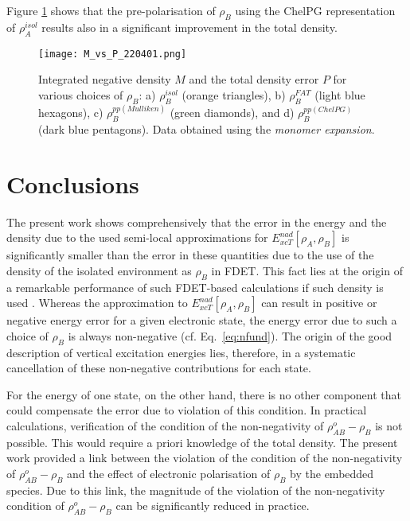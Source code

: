 \documentclass[journal=jctcce,manuscript=article]{achemso}
\newcommand{\nr}[1]{\color{red}#1\color{black}}
\begin{document}
Figure \ref{fig:M_vs_P} shows that the pre-polarisation of $\rho_B$ using the  ChelPG representation of $\rho_A^{isol}$
results also \nr{in } a significant improvement in the total density.

\begin{figure}[H]
\centering
\texttt{[image: M\_vs\_P\_220401.png]}
\caption{Integrated negative density $M$ and the total density error $P$ for various choices of $\rho_B$:  a) $\rho_B^{isol}$ (orange triangles), b) $\rho_B^{FAT}$ (light blue hexagons), c) $\rho_B^{pp(Mulliken)}$ (green diamonds), and d) $\rho_B^{pp(ChelPG)}$ (dark blue pentagons). Data obtained using the {\it monomer expansion}.}
\label{fig:M_vs_P}
\end{figure}


\section{Conclusions}

The present work shows comprehensively that the error in the energy and the density due to the used semi-local approximations for 
${E}_{xcT}^{nad}[\rho_A,\rho_B]$ is significantly  smaller than the error in these quantities due to  the use of the density of the isolated environment as $\rho_B$ in FDET.
This fact lies at the origin of  a  remarkable performance of such FDET\nr{-}based calculations if such density is used  \cite{Ricardi2018}.
Whereas  the approximation  to ${E}_{xcT}^{nad}[\rho_A,\rho_B]$ can result in \nr{positive or negative energy error for } a given electronic state, the \nr{energy error due to  such a choice of $\rho_B$ } is always non-negative (cf. Eq.~\ref{eq:nfund}). The origin of the good description of vertical excitation energies lies, therefore, in a systematic cancellation of these non-negative contributions for each state.

For the energy of one state, on the other hand, there is no other component that could compensate \nr{the } error due to violation of this condition. In practical calculations, verification  of the condition of the non-negativity of $\rho^{o}_{AB}-\rho_B$ is not possible. This would require a priori knowledge of the total density.
The present work provided a link between the violation of the condition of the non-negativity of $\rho^{o}_{AB}-\rho_B$
and the effect of electronic polarisation of $\rho_B$ by the embedded species. Due to this link, the magnitude
of the violation of the non-negativity condition of $\rho^{o}_{AB}-\rho_B$ can be significantly reduced  in practice.
\end{document}
